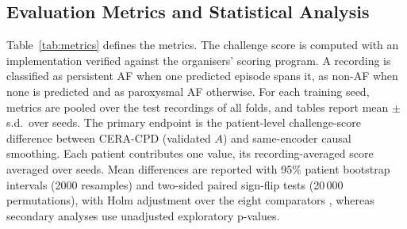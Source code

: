 \documentclass[preprint,12pt]{elsarticle}
\newcommand{\method}{CERA-CPD}
\newcommand{\1}{\mathbf{1}}
\begin{document}
\subsection{Evaluation Metrics and Statistical Analysis}
\label{sec:metrics}
Table~\ref{tab:metrics} defines the metrics. The challenge score is computed with an implementation verified against the organisers' scoring program. A recording is classified as persistent AF when one predicted episode spans it, as non-AF when none is predicted and as paroxysmal AF otherwise. For each training seed, metrics are pooled over the test recordings of all folds, and tables report mean $\pm$ s.d.\ over seeds. The primary endpoint is the patient-level challenge-score difference between \method{} (validated $A$) and same-encoder causal smoothing. Each patient contributes one value, its recording-averaged score averaged over seeds. Mean differences are reported with 95\% patient bootstrap intervals (2000 resamples) \cite{efron1993} and two-sided paired sign-flip tests (20\,000 permutations), with Holm adjustment over the eight comparators \cite{holm1979}, whereas secondary analyses use unadjusted exploratory p-values.
\end{document}
